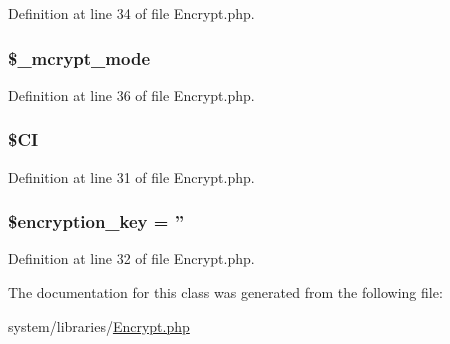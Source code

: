 Definition at line 34 of file Encrypt.\-php.

\hypertarget{class_c_i___encrypt_ace4d98b5320c7fe75e6a38505abcdb82}{
\subsubsection[{\$\-\_\-mcrypt\-\_\-mode}]{\setlength{\rightskip}{0pt plus 5cm}\$\-\_\-mcrypt\-\_\-mode}}\label{class_c_i___encrypt_ace4d98b5320c7fe75e6a38505abcdb82}


Definition at line 36 of file Encrypt.\-php.

\hypertarget{class_c_i___encrypt_ae0314d046ddf7fcfaec03222977427d3}{
\subsubsection[{\$\-C\-I}]{\setlength{\rightskip}{0pt plus 5cm}\$C\-I}}\label{class_c_i___encrypt_ae0314d046ddf7fcfaec03222977427d3}


Definition at line 31 of file Encrypt.\-php.

\hypertarget{class_c_i___encrypt_a35bbf76a5bcca90ca9b39368ed28121c}{
\subsubsection[{\$encryption\-\_\-key}]{\setlength{\rightskip}{0pt plus 5cm}\$encryption\-\_\-key = ''}}\label{class_c_i___encrypt_a35bbf76a5bcca90ca9b39368ed28121c}


Definition at line 32 of file Encrypt.\-php.



The documentation for this class was generated from the following file\-:\begin{DoxyCompactItemize}
\item 
system/libraries/\hyperlink{_encrypt_8php}{Encrypt.\-php}\end{DoxyCompactItemize}

